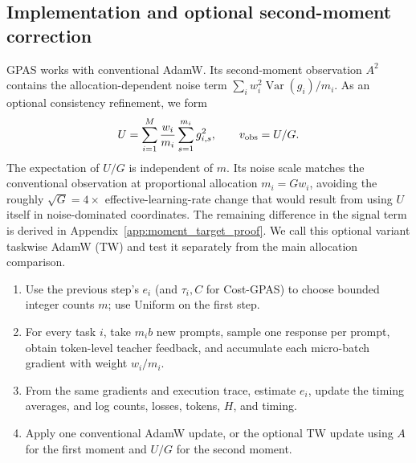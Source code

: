 \subsection{Implementation and optional second-moment correction}

GPAS works with conventional AdamW. Its second-moment observation $A^2$
contains the allocation-dependent noise term
$\sum_i w_i^2\operatorname{Var}(g_i)/m_i$. As an optional consistency
refinement, we form
\begin{equation}
    U=\sum_{i=1}^M\frac{w_i}{m_i}\sum_{s=1}^{m_i}g_{i,s}^2,
    \qquad v_{\rm obs}=U/G.
    \label{eq:taskwise_square_observation}
\end{equation}
The expectation of $U/G$ is independent of $m$. Its noise scale matches the
conventional observation at proportional allocation $m_i=Gw_i$, avoiding the
roughly $\sqrt G=4\times$ effective-learning-rate change that would result from
using $U$ itself in noise-dominated coordinates. The remaining difference in
the signal term is derived in Appendix~\ref{app:moment_target_proof}. We call
this optional variant taskwise AdamW (TW) and test it separately from the main
allocation comparison.

\begin{algorithm}[H]
\caption{One optimizer step and the next GPAS allocation.}
\label{alg:batch_gpas}
\small
\begin{minipage}{0.97\linewidth}
\begin{enumerate}
    \item Use the previous step's $e_i$ (and $\tau_i,C$ for Cost-GPAS) to
    choose bounded integer counts $m$; use Uniform on the first step.
    \item For every task $i$, take $m_i b$ new prompts, sample one response per
    prompt, obtain token-level teacher feedback, and accumulate each
    micro-batch gradient with weight $w_i/m_i$.
    \item From the same gradients and execution trace, estimate $e_i$, update
    the timing averages, and log counts, losses, tokens, $H$, and timing.
    \item Apply one conventional AdamW update, or the optional TW update using
    $A$ for the first moment and $U/G$ for the second moment.
\end{enumerate}
\end{minipage}
\end{algorithm}
